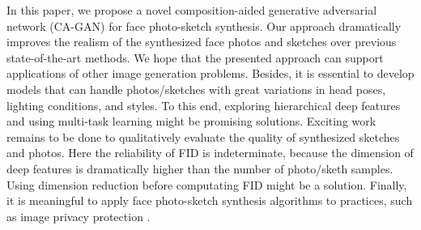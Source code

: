 \documentclass[journal]{IEEEtran}
\begin{document}
In this paper, we propose a novel composition-aided generative adversarial network (CA-GAN) for face photo-sketch synthesis. Our approach dramatically improves the realism of the synthesized face photos and sketches over previous state-of-the-art methods. We hope that the presented approach can support applications of other image generation problems. Besides, it is essential to develop models that can handle photos/sketches with great variations in head poses, lighting conditions, and styles. To this end, exploring hierarchical deep features \cite{Yu2019PAMI, Yu2019TNNLS} and using multi-task learning \cite{Yu2018TIE} might be promising solutions. Exciting work remains to be done to qualitatively evaluate the quality of synthesized sketches and photos. Here the reliability of FID is indeterminate, because the dimension of deep features is dramatically higher than the number of photo/sketh samples. Using dimension reduction \cite{LIU2019DLRPP} before computating FID might be a solution. Finally, it is meaningful to apply face photo-sketch synthesis algorithms to practices, such as image privacy protection \cite{Yu2017TIFS}. 












\end{document}
